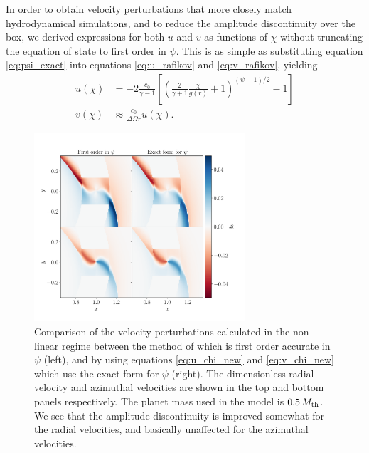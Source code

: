In order to obtain velocity perturbations that more closely match hydrodynamical simulations, and to reduce the amplitude discontinuity over the box, we derived expressions for both $u$ and $v$ as functions of $\chi$ without truncating the equation of state to first order in $\psi$. 
This is as simple as substituting equation \ref{eq:psi_exact} into equations \ref{eq:u_rafikov} and \ref{eq:v_rafikov}, yielding
\begin{align}
    u(\chi) &= -2 \frac{c_0}{\gamma - 1} \left[ \left( \frac{2}{\gamma + 1} \frac{\chi}{g(r)} +1  \right)^{(\psi-1)/2} -1 \right] \label{eq:u_chi_new} \\
    v(\chi) &\approx \frac{c_0}{\Delta\Omega r} u (\chi). \label{eq:v_chi_new} 
\end{align}
\begin{figure}
    \centering
    \includegraphics[width = 0.7\textwidth]{figures/0_5_mth.pdf}
    \caption{Comparison of the velocity perturbations calculated in the non-linear regime between the method of \citet{bollati2021} which is first order accurate in $\psi$ (left), and by using equations \ref{eq:u_chi_new} and \ref{eq:v_chi_new} which use the exact form for $\psi$ (right). The dimensionless radial velocity and azimuthal velocities are shown in the top and bottom panels respectively. The planet mass used in the model is $0.5 \, M_{\rm th}$. We see that the amplitude discontinuity is improved somewhat for the radial velocities, and basically unaffected for the azimuthal velocities.}
    \label{fig:0_5mth}
\end{figure}
